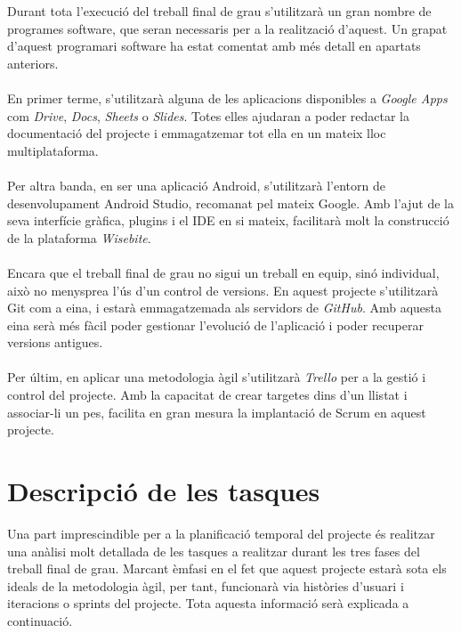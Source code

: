 Durant tota l'execució del treball final de grau s'utilitzarà un gran nombre de programes software, que seran necessaris per a la realització d'aquest. Un grapat d'aquest programari software ha estat comentat amb més detall en apartats anteriors.
\\\\
En primer terme, s'utilitzarà alguna de les aplicacions disponibles a \textit{Google Apps}\cite{gsuite} com \textit{Drive}, \textit{Docs}, \textit{Sheets} o \textit{Slides}. Totes elles ajudaran a poder redactar la documentació del projecte i emmagatzemar tot ella en un mateix lloc multiplataforma.
\\\\
Per altra banda, en ser una aplicació Android, s'utilitzarà l'entorn de desenvolupament Android Studio\cite{androidstudio}, recomanat pel mateix Google. Amb l'ajut de la seva interfície gràfica, plugins i el IDE en si mateix, facilitarà molt la construcció de la plataforma \textit{Wisebite}.
\\\\
Encara que el treball final de grau no sigui un treball en equip, sinó individual, això no menysprea l'ús d'un control de versions. En aquest projecte s'utilitzarà Git com a eina, i estarà emmagatzemada als servidors de \textit{GitHub}\cite{github}. Amb aquesta eina serà més fàcil poder gestionar l'evolució de l'aplicació i poder recuperar versions antigues.
\\\\
Per últim, en aplicar una metodologia àgil s'utilitzarà \textit{Trello}\cite{trello} per a la gestió i control del projecte. Amb la capacitat de crear targetes dins d'un llistat i associar-li un pes, facilita en gran mesura la implantació de Scrum en aquest projecte.


\section{Descripció de les tasques}

Una part imprescindible per a la planificació temporal del projecte és realitzar una anàlisi molt detallada de les tasques a realitzar durant les tres fases del treball final de grau. Marcant èmfasi en el fet que aquest projecte estarà sota els ideals de la metodologia àgil, per tant, funcionarà via històries d'usuari i iteracions o sprints del projecte. Tota aquesta informació serà explicada a continuació.


